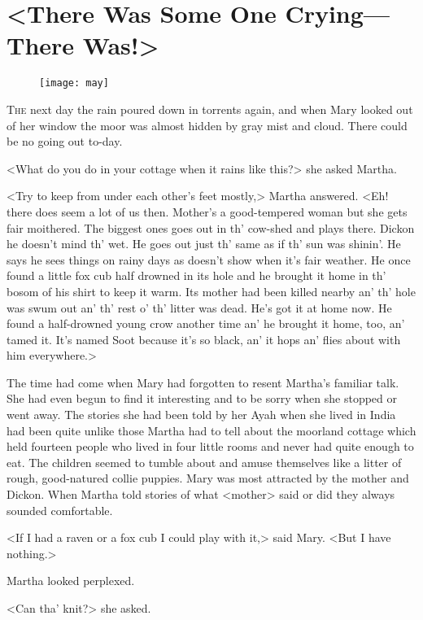 \chapter{<There Was Some One Crying—There Was!>}
\begin{figure}[t!]
\centering
\texttt{[image: may]}
\end{figure}

	\lettrine[]{T}{he} next day the rain poured down in torrents again, and when Mary looked out of her window the moor was almost hidden by gray mist and cloud. There could be no going out to-day.

\zz
<What do you do in your cottage when it rains like this?> she asked Martha.

<Try to keep from under each other's feet mostly,> Martha answered. <Eh! there does seem a lot of us then. Mother's a good-tempered woman but she gets fair moithered. The biggest ones goes out in th' cow-shed and plays there. Dickon he doesn't mind th' wet. He goes out just th' same as if th' sun was shinin'. He says he sees things on rainy days as doesn't show when it's fair weather. He once found a little fox cub half drowned in its hole and he brought it home in th' bosom of his shirt to keep it warm. Its mother had been killed nearby an' th' hole was swum out an' th' rest o' th' litter was dead. He's got it at home now. He found a half-drowned young crow another time an' he brought it home, too, an' tamed it. It's named Soot because it's so black, an' it hops an' flies about with him everywhere.>

The time had come when Mary had forgotten to resent Martha's familiar talk. She had even begun to find it interesting and to be sorry when she stopped or went away. The stories she had been told by her Ayah when she lived in India had been quite unlike those Martha had to tell about the moorland cottage which held fourteen people who lived in four little rooms and never had quite enough to eat. The children seemed to tumble about and amuse themselves like a litter of rough, good-natured collie puppies. Mary was most attracted by the mother and Dickon. When Martha told stories of what <mother> said or did they always sounded comfortable.

<If I had a raven or a fox cub I could play with it,> said Mary. <But I have nothing.>

Martha looked perplexed.

<Can tha' knit?> she asked.

